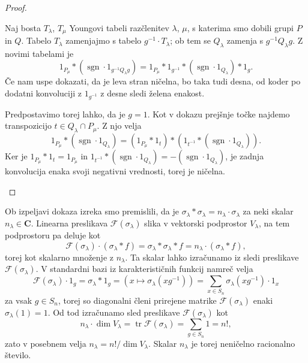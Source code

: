 \documentclass[11pt]{book}
\def\CC{\mathbf{C}}
\def\Fcal{\mathcal{F}}
\def\youngsym{\sigma_{\lambda}}
\DeclareMathOperator\sgn{sgn}
\DeclareMathOperator\tr{tr}
\theoremstyle{definition}
\theoremstyle{zgled}
\theoremstyle{zgledbrezstevilke}
\theoremstyle{odprtproblem}
\theoremstyle{domacanaloga}
\newenvironment{dokaz}
    {\color{siva}\begin{proof}}
    {\end{proof}}
\theoremstyle{izrek}
\begin{document}
\begin{dokaz}
\begin{enumerate}
    Naj bosta $T_{\lambda}$, $T_{\mu}$ Youngovi tabeli razčlenitev $\lambda$, $\mu$, s katerima smo dobili grupi $P$ in $Q$. Tabelo $T_{\lambda}$ zamenjajmo s tabelo $g^{-1} \cdot T_{\lambda}$; ob tem se $Q_{\lambda}$ zamenja s $g^{-1} Q_{\lambda} g$. Z novimi tabelami je
    \[
        1_{P_\mu} * (\sgn \cdot 1_{g^{-1} Q_{\lambda} g}) = 1_{P_\mu} * 1_{g^{-1}} * (\sgn \cdot 1_{Q_{\lambda}}) * 1_g.
    \]
    Če nam uspe dokazati, da je leva stran ničelna, bo taka tudi desna, od koder po dodatni konvoluciji z $1_{g^{-1}}$ z desne sledi želena enakost.

    Predpostavimo torej lahko, da je $g = 1$. Kot v dokazu prejšnje točke najdemo transpozicijo $t \in Q_{\lambda} \cap P_{\mu}$. Z njo velja
    \[
        1_{P_{\mu}} * (\sgn \cdot 1_{Q_{\lambda}}) = 
        \left( 1_{P_{\mu}} * 1_t \right) * \left( 1_{t^{-1}} * (\sgn \cdot 1_{Q_{\lambda}}) \right).
    \]
    Ker je $1_{P_{\mu}} * 1_t = 1_{P_{\mu}}$ in $1_{t^{-1}} * (\sgn \cdot 1_{Q_{\lambda}}) = - (\sgn \cdot 1_{Q_{\lambda}})$, je zadnja konvolucija enaka svoji negativni vrednosti, torej je ničelna.
\end{enumerate}
\end{dokaz}

Ob izpeljavi dokaza izreka smo premislili, da je $\youngsym * \youngsym = n_{\lambda} \cdot \youngsym$ za neki skalar $n_{\lambda} \in \CC$. Linearna preslikava $\Fcal(\youngsym)$ slika v vektorski podprostor $V_{\lambda}$, na tem podprostoru pa deluje kot
\[
    \Fcal(\youngsym) \cdot (\youngsym * f) 
    = \youngsym * \youngsym * f
    = n_{\lambda} \cdot (\youngsym * f),
\]
torej kot skalarno množenje z $n_{\lambda}$. Ta skalar lahko izračunamo iz sledi preslikave $\Fcal(\youngsym)$. V standardni bazi iz karakterističnih funkcij namreč velja
\[
    \Fcal(\youngsym) \cdot 1_g
    = \youngsym * 1_g
    = \left( x \mapsto \youngsym(x g^{-1}) \right)
    = \sum_{x \in S_n} \youngsym(x g^{-1}) \cdot 1_x
\]
za vsak $g \in S_n$, torej so diagonalni členi prirejene matrike $\Fcal(\youngsym)$ enaki $\youngsym(1) = 1$. Od tod izračunamo sled preslikave $\Fcal(\youngsym)$ kot
\[
    n_{\lambda} \cdot \dim V_{\lambda} 
    = \tr \Fcal(\youngsym)
    = \sum_{g \in S_n} 1
    = n!,
\]
zato v posebnem velja $n_{\lambda} = n! / \dim V_{\lambda}$. Skalar $n_{\lambda}$ je torej neničelno racionalno število.
\end{document}
